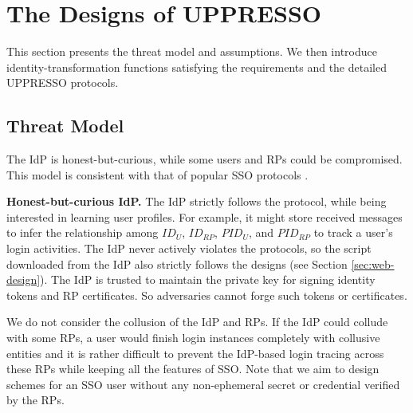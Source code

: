 
\section{The Designs of UPPRESSO}
\label{sec:UPPRESSO}

This section presents the threat model and assumptions.
We then introduce identity-transformation functions satisfying the requirements
    and the detailed UPPRESSO protocols.


\subsection{Threat Model}
The IdP is honest-but-curious,
 while some users and RPs could be compromised. %
This model is consistent with that of popular SSO protocols \cite{OpenIDConnect,rfc6749,SAML,SAMLIdentifier,NIST2017draft}.


\vspace{0.5mm}
\noindent \textbf{Honest-but-curious IdP.}
The IdP strictly follows the protocol, while being interested in learning user profiles.
For example, it might store received messages
 to infer the relationship among $ID_U$, $ID_{RP}$, $PID_{U}$, and $PID_{RP}$ to track a user's login activities.
The IdP never actively violates the protocols,
so the script downloaded from the IdP also strictly follows the designs (see Section \ref{sec:web-design}).
The IdP is trusted to maintain the private key for signing identity tokens and RP certificates. %
So adversaries cannot forge such tokens or certificates.

We do not consider the collusion of the IdP and RPs.
    If the IdP could collude with some RPs,
        a user would finish login instances completely with collusive entities
        and it is rather difficult to prevent the IdP-based login tracing across these RPs
            while keeping all the features of SSO.
Note that we aim to design schemes for an SSO user without any non-ephemeral secret or credential verified by the RPs.

